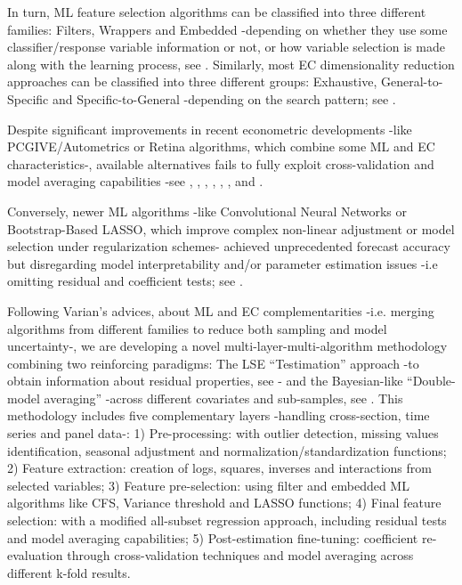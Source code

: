 \documentclass{juliacon}
\begin{document}
In turn, ML feature selection algorithms can be classified into three different families: Filters, Wrappers and Embedded -depending on whether they use some classifier/response variable information or not, or how variable selection is made along with the learning process, see \cite{chandras2014}. Similarly, most EC dimensionality reduction approaches can be classified into three different groups: Exhaustive, General-to-Specific and Specific-to-General -depending on the search pattern; see \cite{gluzmann2015}. \vskip 6pt

Despite significant improvements in recent econometric developments -like PCGIVE/Autometrics or Retina algorithms, which combine some ML and EC characteristics-, available alternatives fails to fully exploit cross-validation and model averaging capabilities -see \cite{Doornik09autometrics}, \cite{perezamaral2003}, \cite{DAVIDSON1981}, \cite{derksen1992}, \cite{marinucci2008}, \cite{herwartz2010}, and \cite{castle2006}. \vskip 6pt

Conversely, newer ML algorithms -like Convolutional Neural Networks or Bootstrap-Based LASSO, which improve complex non-linear adjustment or model selection under regularization schemes- achieved unprecedented forecast accuracy but disregarding model interpretability and/or parameter estimation issues -i.e omitting residual and coefficient tests; see \cite{Bzdok2018}. \vskip 6pt

Following Varian’s \cite{varian2014} advices, about ML and EC complementarities -i.e. merging algorithms from different families to reduce both sampling and model uncertainty-, we are developing a novel multi-layer-multi-algorithm methodology combining two reinforcing paradigms: The LSE “Testimation” approach -to obtain information about residual properties, see \cite{abramovich2006}- and the Bayesian-like “Double-model averaging” -across different covariates and sub-samples, see \cite{hoetening1999}. This methodology includes five complementary layers -handling cross-section, time series and panel data-: 1) Pre-processing: with outlier detection, missing values identification, seasonal adjustment and normalization/standardization functions; 2) Feature extraction: creation of logs, squares, inverses and interactions from selected variables; 3) Feature pre-selection: using filter and embedded ML algorithms like CFS, Variance threshold and LASSO functions; 4) Final feature selection: with a modified all-subset regression approach, including residual tests and model averaging capabilities; 5) Post-estimation fine-tuning: coefficient re-evaluation through cross-validation techniques and model averaging across different k-fold results. \vskip 6pt
\end{document}
